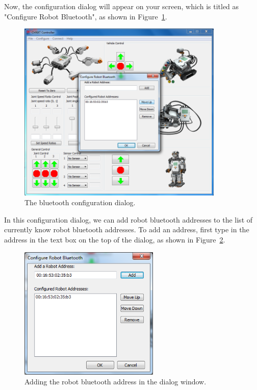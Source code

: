 \documentclass[11pt]{article}
\begin{document}
Now, the configuration dialog will appear on your screen, which is titled as "Configure Robot Bluetooth", as shown in 
Figure~\ref{fig:config_dialog}.

\begin{figure}[H]
  \begin{center}
    \includegraphics[height=3.4in]{figure/configuration/configDlg.png}
    \caption{The bluetooth configuration dialog.\label{fig:config_dialog}}
  \end{center}
\end{figure}

In this configuration dialog, we can add robot bluetooth addresses to the list of currently know robot bluetooth addresses.
To add an address, first type in the address in the text box on the top of the dialog, as shown in Figure~\ref{fig:add_address}.

\begin{figure}[H]
  \begin{center}
    \includegraphics[height=2.5in]{figure/configuration/addBTaddress.png}
    \caption{Adding the robot bluetooth address in the dialog window.\label{fig:add_address}}
  \end{center}
\end{figure}
\end{document}
